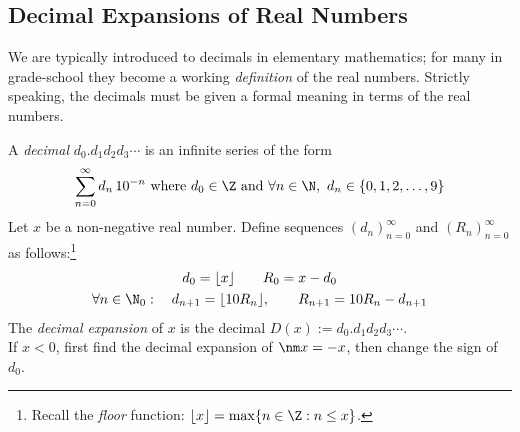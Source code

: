 \graphicspath{{notes/3series/asy/}}

\thispagestyle{empty}

\subsection*{Decimal Expansions of Real Numbers}

We are typically introduced to decimals in elementary mathematics; for many in grade-school they become a working \emph{definition} of the real numbers. Strictly speaking, the decimals must be given a formal meaning in terms of the real numbers.

\begin{defn*}
A \emph{decimal} $d_0.d_1d_2d_3\cdots$ is an infinite series of the form
\[\sum_{n=0}^\infty d_n\,10^{-n}\text{ where }d_0\in\Z\text{ and }\forall n\in\N,\ d_n\in\{0,1,2,\ldots,9\}\]
Let $x$ be a non-negative real number. Define sequences $(d_n)_{n=0}^\infty$ and $(R_n)_{n=0}^\infty$ as follows:\footnote{Recall the \emph{floor} function: $\lfloor x\rfloor =\max\{n\in\Z:n\le x\}$.}
\begin{gather*}
d_0=\lfloor x\rfloor\qquad R_0=x-d_0\\
\forall n\in\N_0:\quad d_{n+1}=\lfloor 10R_n\rfloor,\qquad R_{n+1}=10R_n-d_{n+1}
\end{gather*}
The \emph{decimal expansion} of $x$ is the decimal $D(x):=d_0.d_1d_2d_3\cdots$.\\
If $x<0$, first find the decimal expansion of $\nm x=-x$, then change the sign of $d_0$.
\end{defn*}


